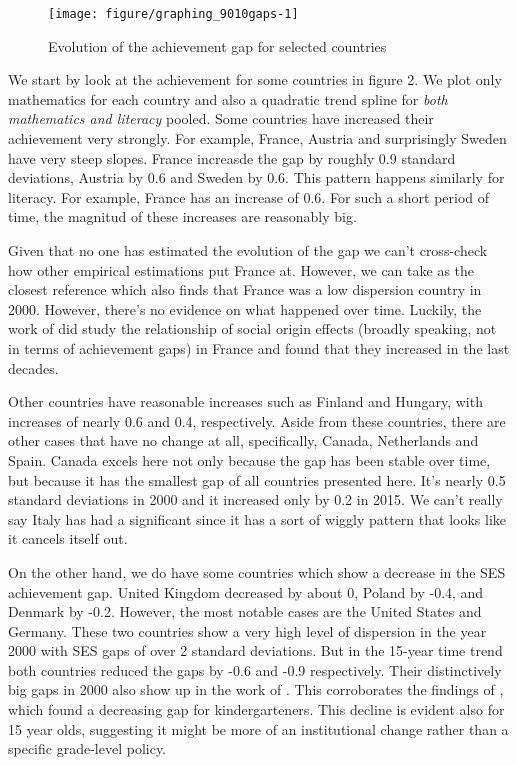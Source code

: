 \documentclass[11pt, a4paper]{article}\usepackage[]{graphicx}\usepackage[]{color}
\begin{document}
\begin{figure}
\begin{center}


{\centering \texttt{[image: figure/graphing\_9010gaps-1]} 

}



\caption{Evolution of the achievement gap for selected countries}
\end{center}
\end{figure}

We start by look at the achievement for some countries in figure 2. We plot only mathematics for each country and also a quadratic trend spline for \emph{both mathematics and literacy} pooled. Some countries have increased their achievement very strongly. For example, France, Austria and surprisingly Sweden have very steep slopes. France increasde the gap by roughly 0.9 standard deviations, Austria by 0.6 and Sweden by 0.6. This pattern happens similarly for literacy. For example, France has an increase of 0.6. For such a short period of time, the magnitud of these increases are reasonably big.

Given that no one has estimated the evolution of the gap we can't cross-check how other empirical estimations put France at. However, we can take \citet{micklewright} as the closest reference which also finds that France was a low dispersion country in 2000. However, there's no evidence on what happened over time. Luckily, the work of \citet{bernardi2016} did study the relationship of social origin effects (broadly speaking, not in terms of achievement gaps) in France and found that they increased in the last decades.

Other countries have reasonable increases such as Finland and Hungary, with increases of nearly 0.6 and 0.4, respectively. Aside from these countries, there are other cases that have no change at all, specifically, Canada, Netherlands and Spain. Canada excels here not only because the gap has been stable over time, but because it has the smallest gap of all countries presented here. It's nearly 0.5 standard deviations in 2000 and it increased only by 0.2 in 2015. We can't really say Italy has had a significant since it has a sort of wiggly pattern that looks like it cancels itself out.

On the other hand, we do have some countries which show a decrease in the SES achievement gap. United Kingdom decreased by about 0, Poland by -0.4, and Denmark by -0.2. However, the most notable cases are the United States and Germany. These two countries show a very high level of dispersion in the year 2000 with SES gaps of over 2 standard deviations. But in the 15-year time trend both countries reduced the gaps by -0.6 and -0.9 respectively. Their distinctively big gaps in 2000 also show up in the work of \citet{micklewright}. This corroborates the findings of \citet{reardon_portilla}, which found a decreasing gap for kindergarteners. This decline is evident also for 15 year olds, suggesting it might be more of an institutional change rather than a specific grade-level policy.
\end{document}
